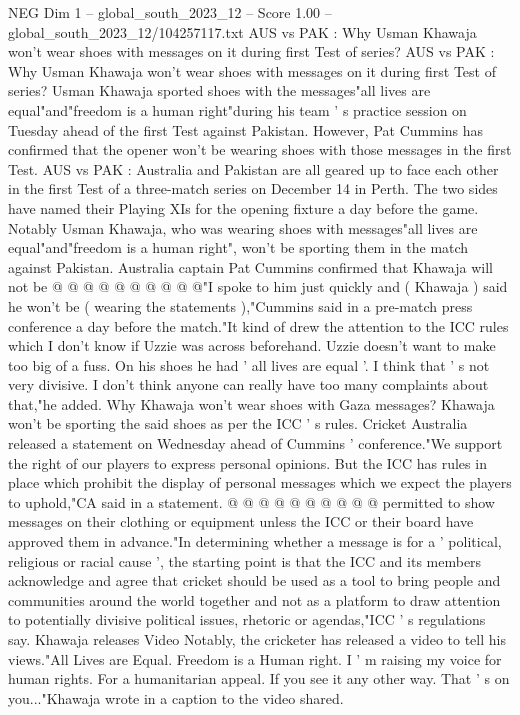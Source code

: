 \begin{textsample}{NEG Dim 1 – global\_south\_2023\_12 – Score 1.00 – global\_south\_2023\_12/104257117.txt}  \label{ex:f1_neg_417}
AUS vs PAK : Why Usman Khawaja won't wear shoes with messages on it during first Test of series?
AUS vs PAK : Why Usman Khawaja won't wear shoes with messages on it during first Test of series?
Usman Khawaja sported shoes with the messages"all lives are equal"and"freedom is a human right"during his team ' s practice session on Tuesday ahead of the first Test against Pakistan.
However, Pat Cummins has confirmed that the opener won't be wearing shoes with those messages in the first Test.
AUS vs PAK : Australia and Pakistan are all geared up to face each other in the first Test of a three-match series on December 14 in Perth.
The two sides have named their Playing XIs for the opening fixture a day before the game.
Notably Usman Khawaja, who was wearing shoes with messages"all lives are equal"and"freedom is a human right", won't be sporting them in the match against Pakistan.
Australia captain Pat Cummins confirmed that Khawaja will not be @ @ @ @ @ @ @ @ @ @"I spoke to him just quickly and ( Khawaja ) said he won't be ( wearing the statements ),"Cummins said in a pre-match press conference a day before the match."It kind of drew the attention to the ICC rules which I don't know if Uzzie was across beforehand.
Uzzie doesn't want to make too big of a fuss.
On his shoes he had ' all lives are equal '.
I think that ' s not very divisive.
I don't think anyone can really have too many complaints about that,"he added.
Why Khawaja won't wear shoes with Gaza messages?
Khawaja won't be sporting the said shoes as per the ICC ' s rules.
Cricket Australia released a statement on Wednesday ahead of Cummins ' conference."We support the right of our players to express personal opinions.
But the ICC has rules in place which prohibit the display of personal messages which we expect the players to uphold,"CA said in a statement. @ @ @ @ @ @ @ @ @ @ permitted to show messages on their clothing or equipment unless the ICC or their board have approved them in advance."In determining whether a message is for a ' political, religious or racial cause ', the starting point is that the ICC and its members acknowledge and agree that cricket should be used as a tool to bring people and communities around the world together and not as a platform to draw attention to potentially divisive political issues, rhetoric or agendas,"ICC ' s regulations say.
Khawaja releases Video Notably, the cricketer has released a video to tell his views."All Lives are Equal.
Freedom is a Human right.
I ' m raising my voice for human rights.
For a humanitarian appeal.
If you see it any other way.
That ' s on you..."Khawaja wrote in a caption to the video shared.

\end{textsample}
